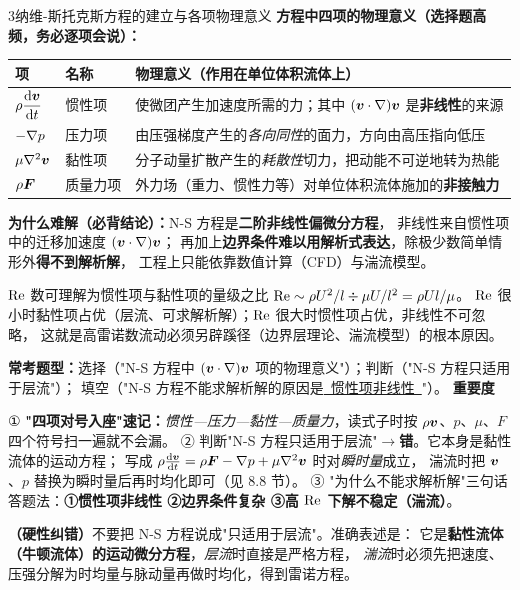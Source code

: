 \begin{kaodian}{3}{纳维-斯托克斯方程的建立与各项物理意义}
\textbf{方程中四项的物理意义（选择题高频，务必逐项会说）：}
\begin{center}
\begin{tabularx}{\textwidth}{@{}lXX@{}}
\toprule
项 & 名称 & 物理意义（作用在单位体积流体上） \\
\midrule
$\rho\dfrac{\mathrm{d} \bm{v}}{\mathrm{d} t}$ & 惯性项 & 使微团产生加速度所需的力；其中 $(\bm{v}\cdot\nabla)\bm{v}$ 是\textbf{非线性}的来源 \\
$-\nabla p$ & 压力项 & 由压强梯度产生的\emph{各向同性}的面力，方向由高压指向低压 \\
$\mu\nabla^2\bm{v}$ & 黏性项 & 分子动量扩散产生的\emph{耗散性}切力，把动能不可逆地转为热能 \\
$\rho\bm{F}$ & 质量力项 & 外力场（重力、惯性力等）对单位体积流体施加的\textbf{非接触力} \\
\bottomrule
\end{tabularx}
\end{center}

\textbf{为什么难解（必背结论）：}N-S 方程是\textbf{二阶非线性偏微分方程}，
非线性来自惯性项中的迁移加速度 $(\bm{v}\cdot\nabla)\bm{v}$；
再加上\textbf{边界条件难以用解析式表达}，除极少数简单情形外\textbf{得不到解析解}，
工程上只能依靠数值计算（CFD）与湍流模型。

\begin{jielun}
$\mathrm{Re}$ 数可理解为惯性项与黏性项的量级之比 $\mathrm{Re}\sim\rho U^2/l \div \mu U/l^2=\rho Ul/\mu$。
$\mathrm{Re}$ 很小时黏性项占优（层流、可求解析解）；$\mathrm{Re}$ 很大时惯性项占优，非线性不可忽略，
这就是高雷诺数流动必须另辟蹊径（边界层理论、湍流模型）的根本原因。
\end{jielun}

\textbf{常考题型：}选择（"N-S 方程中 $(\bm{v}\cdot\nabla)\bm{v}$ 项的物理意义"）；判断（"N-S 方程只适用于层流"）；
填空（"N-S 方程不能求解析解的原因是\underline{\ 惯性项非线性\ }"）。
\textbf{重要度 }\quad{}\quad{}

\begin{banfa}
① \textbf{"四项对号入座"速记：}\emph{惯性—压力—黏性—质量力}，读式子时按 $\rho\bm{v}$、$p$、$\mu$、$F$ 四个符号扫一遍就不会漏。
② 判断"N-S 方程只适用于层流"$\to$\textbf{错}。它本身是黏性流体的运动方程；
写成 $\rho\frac{\mathrm{d} \bm{v}}{\mathrm{d} t}=\rho\bm{F}-\nabla p+\mu\nabla^2\bm{v}$ 时对\emph{瞬时量}成立，
湍流时把 $\bm{v}$、$p$ 替换为瞬时量后再时均化即可（见 8.8 节）。
③ "为什么不能求解析解"三句话答题法：\textbf{①惯性项非线性 ②边界条件复杂 ③高 $\mathrm{Re}$ 下解不稳定（湍流）}。
\end{banfa}

\begin{yicuo}
\textbf{（硬性纠错）}不要把 N-S 方程说成"只适用于层流"。准确表述是：
它是\textbf{黏性流体（牛顿流体）的运动微分方程}，\emph{层流}时直接是严格方程，
\emph{湍流}时必须先把速度、压强分解为时均量与脉动量再做时均化，得到雷诺方程。
\end{yicuo}
\end{kaodian}

